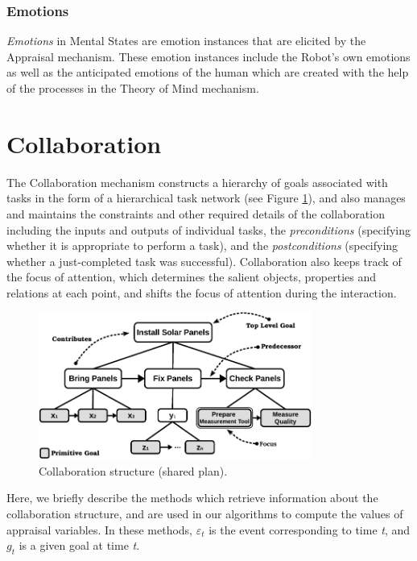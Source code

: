 \subsubsection{Emotions}

\textit{Emotions} in Mental States are emotion instances that are elicited by
the Appraisal mechanism. These emotion instances include the Robot's own
emotions as well as the anticipated emotions of the human which are created with
the help of the processes in the Theory of Mind mechanism.

\section{Collaboration}

The Collaboration mechanism constructs a hierarchy of goals associated with
tasks in the form of a hierarchical task network (see Figure \ref{fig:cs}), and
also manages and maintains the constraints and other required details of the
collaboration including the inputs and outputs of individual tasks, the
\textit{preconditions} (specifying whether it is appropriate to perform a task),
and the \textit{postconditions} (specifying whether a just-completed task was
successful). Collaboration also keeps track of the focus of attention, which
determines the salient objects, properties and relations at each point, and
shifts the focus of attention during the interaction.

\begin{figure}[tbh]
  \centering
  \includegraphics[width=0.8\textwidth]{figure/collaborationStructure-croped.pdf}
  \caption{{\fontsize{9}{9}\selectfont Collaboration structure (shared plan).}}
  \label{fig:cs}
\end{figure}

Here, we briefly describe the methods which retrieve information about the
collaboration structure, and are used in our algorithms to compute the values of
appraisal variables. In these methods, $\varepsilon_t$ is the event
corresponding to time \textit{t}, and $g_t$ is a given goal at time \textit{t}. 


